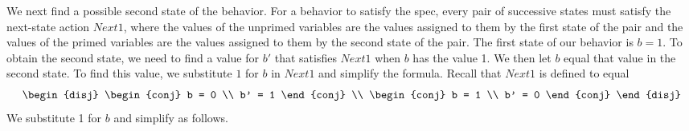 \documentclass[fleqn,leqno]{article}
\begin{document}
We next find a possible second state of the behavior.  For a behavior
to satisfy the spec, every pair of successive states must satisfy the
next-state action $Next1$, where the values of the unprimed variables
are the values assigned to them by the first state of the pair and the
values of the primed variables are the values assigned to them by the
second state of the pair.  The first state of our behavior is $b=1$.
To obtain the second state, we need to find a value for $b'$ that
satisfies $Next1$ when $b$ has the value 1.  We then let $b$ equal
that value in the second state.  To find this value, we substitute
$1$ for $b$ in $Next1$ and simplify the formula.  Recall that $Next1$
is defined to equal
 \[ \begin{disj}
    \begin{conj}
            b = 0 \\
            b' = 1
     \end{conj} \\
      \begin{conj}
         b = 1 \\
         b' = 0
     \end{conj}
    \end{disj}
 \]
We substitute 1 for $b$ and simplify as follows.
\end{document}
